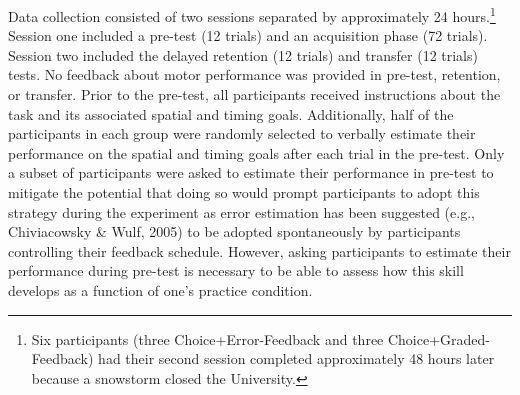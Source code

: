 \documentclass[
  man, donotrepeattitle,floatsintext]{apa7}
\begin{document}
Data collection consisted of two sessions separated by approximately 24 hours.\footnote{Six participants (three Choice+Error-Feedback and three Choice+Graded-Feedback) had their second session completed approximately 48 hours later because a snowstorm closed the University.} Session one included a pre-test (12 trials) and an acquisition phase (72 trials). Session two included the delayed retention (12 trials) and transfer (12 trials) tests. No feedback about motor performance was provided in pre-test, retention, or transfer. Prior to the pre-test, all participants received instructions about the task and its associated spatial and timing goals. Additionally, half of the participants in each group were randomly selected to verbally estimate their performance on the spatial and timing goals after each trial in the pre-test. Only a subset of participants were asked to estimate their performance in pre-test to mitigate the potential that doing so would prompt participants to adopt this strategy during the experiment as error estimation has been suggested (e.g., Chiviacowsky \& Wulf, 2005) to be adopted spontaneously by participants controlling their feedback schedule. However, asking participants to estimate their performance during pre-test is necessary to be able to assess how this skill develops as a function of one's practice condition.
\end{document}
